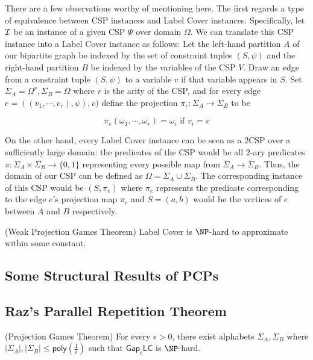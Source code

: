 There are a few observations worthy of mentioning here. The first regards a type of equivalence between CSP instances and Label Cover instances. Specifically, let $\mathcal{I}$ be an instance of a given CSP $\Psi$ over domain $\Omega$. We can translate this CSP instance into a Label Cover instance as follows: Let the left-hand partition $A$ of our bipartite graph be indexed by the set of constraint tuples $(S,\psi)$ and the right-hand partition $B$ be indexed by the variables of the CSP $V$. Draw an edge from a constraint tuple $(S,\psi)$ to a variable $v$ if that variable appears in $S$. Set $\Sigma_A = \Omega^r, \Sigma_B = \Omega$ where $r$ is the arity of the CSP, and for every edge $e = ((v_1,\cdots,v_r), \psi), v)$ define the projection $\pi_e:\Sigma_A \rightarrow \Sigma_B$ to be

\[ \pi_e(\omega_1, \cdots, \omega_r) =  \omega_i \text{ if } v_i = v\]\newline


On the other hand, every Label Cover instance can be seen as a $2$CSP over a sufficiently large domain: the predicates of the CSP would be all $2$-ary predicates $\pi:\Sigma_A \times \Sigma_B \rightarrow \{0,1\}$ representing every possible map from $\Sigma_A \rightarrow \Sigma_B$. Thus, the domain of our CSP can be defined as $\Omega = \Sigma_A \cup \Sigma_B$. The corresponding instance of this CSP would be $(S,\pi_e)$ where $\pi_e$ represents the predicate corresponding to the edge $e$'s projection map $\pi_e$ and $S = (a,b)$ would be the vertices of $e$ between $A$ and $B$ respectively.

\begin{theorem} (Weak Projection Games Theorem)
Label Cover is $\NP$-hard to approximate within some constant.
\end{theorem}


\subsection{Some Structural Results of PCPs}


\subsection{Raz's Parallel Repetition Theorem}

\begin{theorem} (Projection Games Theorem) \label{labelcoverhard}
  For every $\epsilon > 0$, there exist alphabets $\Sigma_A, \Sigma_B$ where $|\Sigma_A|,|\Sigma_B| \leq \mathsf{poly}(\frac{1}{\epsilon})$ such that $\mathsf{Gap}_\epsilon\mathsf{LC}$ is $\NP$-hard.
\end{theorem}
